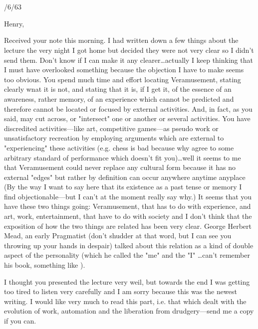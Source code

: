 \documentclass[10pt,twoside,draft]{memoir}
\begin{document}
{\section{}

{ /6/63 \par }

Henry, 


Received your note this morning. I had written down a few things about the 
lecture the very night I got home but decided they were not very clear so I 
didn't send them. Don't know if I can make it any clearer\ldots actually I keep 
thinking that I must have overlooked something because the objection I have 
to make seems too obvious. You spend much time and effort locating 
Veramusement, stating clearly wnat it is not, and stating that it is, if I get it, 
of the essence of an awareness, rather memory, of an experience which 
cannot be predicted and therefore cannot be located or focused by external 
activities. And, in fact, as you said, may cut across, or "intersect" one or 
another or several activities. You have discredited activities---like art, 
competitive games---as pseudo work or unsatisfactory recreation by employing 
arguments which are external to "experiencing" these activities (e.g. chess is 
bad because why agree to some arbitrary standard of performance which 
doesn't fit you)\ldots well it seems to me that Veramusement could never replace 
any cultural form because it has no external "edges" but rather by definition 
can occur anywhere anytime anyplace (By the way I want to say here that 
its existence as a past tense or memory I find objectionable---but I can't at the 
moment really say why.) It seems that you have these two things going: 
Veramusement, that has to do with experience, and art, work, 
entertainment, that have to do with society and I don't think that the 
exposition of how the two things are related has been very clear. George 
Herbert Mead, an early Pragmatist (don't shudder at that word, but I can see 
you throwing up your hands in despair) talked about this relation as a kind 
of double aspect of the personality (which he called the "me" and the "I" 
\ldots can't remember his book, something like ). 

I thought you presented the lecture very weil, but towards the end I was 
getting too tired to listen very carefully and I am sorry because this was the 
newest writing. I would like very much to read this part, i.e. that which dealt 
with the evolution of work, automation and the liberation from 
drudgery---send me a copy if you can. 

}
\end{document}
